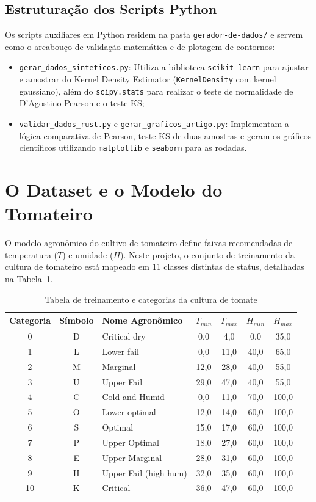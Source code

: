 \documentclass[
	12pt,
	openright,
	oneside,
	a4paper,
	english,
	brazil
	]{abntex2}
\begin{document}
\subsection{Estruturação dos Scripts Python}
Os scripts auxiliares em Python residem na pasta \texttt{gerador-de-dados/} e servem como o arcabouço de validação matemática e de plotagem de contornos:
\begin{itemize}
    \item \texttt{gerar\_dados\_sinteticos.py}: Utiliza a biblioteca \texttt{scikit-learn} para ajustar e amostrar do Kernel Density Estimator (\texttt{KernelDensity} com kernel gaussiano), além do \texttt{scipy.stats} para realizar o teste de normalidade de D'Agostino-Pearson e o teste KS;
    \item \texttt{validar\_dados\_rust.py} e \texttt{gerar\_graficos\_artigo.py}: Implementam a lógica comparativa de Pearson, teste KS de duas amostras e geram os gráficos científicos utilizando \texttt{matplotlib} e \texttt{seaborn} para as rodadas.
\end{itemize}

\section{O Dataset e o Modelo do Tomateiro}

O modelo agronômico do cultivo de tomateiro define faixas recomendadas de temperatura ($T$) e umidade ($H$). Neste projeto, o conjunto de treinamento da cultura de tomateiro está mapeado em 11 classes distintas de status, detalhadas na Tabela~\ref{tab:tomateiro}.

\begin{table}[H]
\centering
\caption{Tabela de treinamento e categorias da cultura de tomate}
\label{tab:tomateiro}
\begin{tabular}{cclcccc}
\toprule
\textbf{Categoria} & \textbf{Símbolo} & \textbf{Nome Agronômico} & \textbf{$T_{min}$} & \textbf{$T_{max}$} & \textbf{$H_{min}$} & \textbf{$H_{max}$} \\ \midrule
0 & D & Critical dry & 0,0 & 4,0 & 0,0 & 35,0 \\
1 & L & Lower fail & 0,0 & 11,0 & 40,0 & 65,0 \\
2 & M & Marginal & 12,0 & 28,0 & 40,0 & 55,0 \\
3 & U & Upper Fail & 29,0 & 47,0 & 40,0 & 55,0 \\
4 & C & Cold and Humid & 0,0 & 11,0 & 70,0 & 100,0 \\
5 & O & Lower optimal & 12,0 & 14,0 & 60,0 & 100,0 \\
6 & S & Optimal & 15,0 & 17,0 & 60,0 & 100,0 \\
7 & P & Upper Optimal & 18,0 & 27,0 & 60,0 & 100,0 \\
8 & E & Upper Marginal & 28,0 & 31,0 & 60,0 & 100,0 \\
9 & H & Upper Fail (high hum) & 32,0 & 35,0 & 60,0 & 100,0 \\
10 & K & Critical & 36,0 & 47,0 & 60,0 & 100,0 \\
\bottomrule
\end{tabular}
\end{table}
\end{document}
